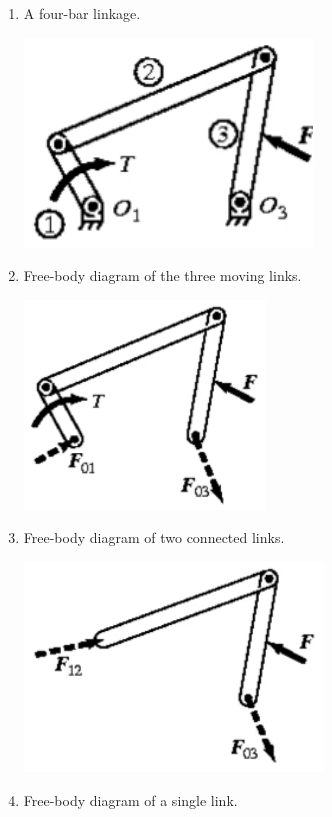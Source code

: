 \documentclass[11pt]{article}
\begin{document}
\begin{enumerate}
\item A four-bar linkage.
\begin{center}
\includegraphics[height=15em]{./images/free-body-diagram-four-bar-linkage.png}
\end{center}
\item Free-body diagram of the three moving links.
\begin{center}
\includegraphics[height=15em]{./images/free-body-diagram-three-moving-links.png}
\end{center}
\item Free-body diagram of two connected links.
\begin{center}
\includegraphics[height=15em]{./images/free-body-diagram-two-connected-links.png}
\end{center}
\item Free-body diagram of a single link.

\end{enumerate}
\end{document}
